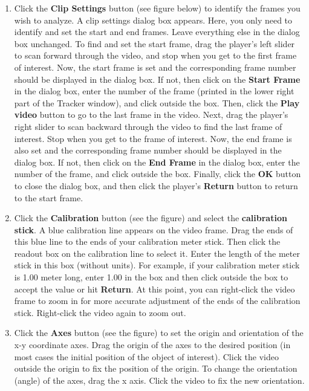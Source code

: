 \begin{enumerate}
\item Click the {\bf Clip Settings} button (see figure below) to identify the frames you wish to analyze. 
A clip settings dialog box appears. 
Here, you only need to identify and set the start and end frames. 
Leave everything else in the dialog box unchanged. 
To find and set the start frame, drag the player's left slider to scan forward through the video, and 
stop when you get to the first frame of interest. 
Now, the start frame is set and the corresponding frame number should be displayed in the dialog box. 
If not, then click on the {\bf Start Frame} in the dialog box, enter the number of the frame 
(printed in the lower right part of the Tracker window), and click outside the box.
Then, click the {\bf Play video} button to go to the last frame in the video. 
Next, drag the player's right slider to scan backward through the video to find the last frame of interest. 
Stop when you get to the frame of interest. Now, the end frame is also set and the corresponding frame 
number should be displayed in the dialog box. 
If not, then click on the {\bf End Frame} in the dialog box, enter the number of the frame, and click 
outside the box.
Finally, click the {\bf OK} button to close the dialog box, and then click the player's {\bf Return} 
button to return to the start frame.

\item Click the {\bf Calibration} button (see the figure) and select the {\bf calibration stick}. 
A blue calibration line appears on the video frame. 
Drag the ends of this blue line to the ends of your calibration meter stick. 
Then click the readout box on the calibration line to select it. 
Enter the length of the meter stick in this box (without units). 
For example, if your calibration meter stick is 1.00 meter long, enter 1.00 in the box 
and then click outside the box to accept the value or hit {\bf Return}. 
At this point, you can right-click the video frame to zoom in for more accurate adjustment of the ends 
of the calibration stick. 
Right-click the video again to zoom out.

\item Click the {\bf Axes} button (see the figure) to set the origin and orientation of the x-y coordinate axes. 
Drag the origin of the axes to the desired position (in most cases the initial position of the object of interest). 
Click the video outside the origin to fix the position of the origin. 
To change the orientation (angle) of the axes, drag the x axis. 
Click the video to fix the new orientation.


\end{enumerate}
